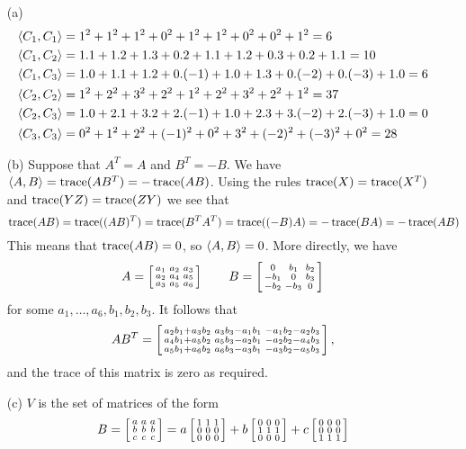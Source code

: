  \begin{itemize}
  \item[(a)]
   \begin{align*}
    \langle C_1,C_1\rangle &= 1^2+1^2+1^2+0^2+1^2+1^2+0^2+0^2+1^2 = 6 \\
    \langle C_1,C_2\rangle &= 1.1+1.2+1.3+0.2+1.1+1.2+0.3+0.2+1.1 = 10 \\
    \langle C_1,C_3\rangle &= 1.0+1.1+1.2+0.(-1)+1.0+1.3+0.(-2)+0.(-3)+1.0 = 6 \\
    \langle C_2,C_2\rangle &= 1^2+2^2+3^2+2^2+1^2+2^2+3^2+2^2+1^2 = 37 \\
    \langle C_2,C_3\rangle &= 1.0+2.1+3.2+2.(-1)+1.0+2.3+3.(-2)+2.(-3)+1.0 = 0 \\
    \langle C_3,C_3\rangle &= 0^2+1^2+2^2+(-1)^2+0^2+3^2+(-2)^2+(-3)^2+0^2 = 28
   \end{align*}
  \item[(b)] Suppose that $A^T=A$ and $B^T=-B$.  We have
   $\langle A,B\rangle=\operatorname{trace}(AB^T)=-\operatorname{trace}(AB)$.  Using the rules
   $\operatorname{trace}(X)=\operatorname{trace}(X^T)$ and $\operatorname{trace}(YZ)=\operatorname{trace}(ZY)$ we see that
   \[ \operatorname{trace}(AB)=\operatorname{trace}((AB)^T)=\operatorname{trace}(B^TA^T)=
      \operatorname{trace}((-B)A)=-\operatorname{trace}(BA)=-\operatorname{trace}(AB)
   \]
   This means that $\operatorname{trace}(AB)=0$, so $\langle A,B\rangle=0$.  More
   directly, we have
   {\tiny \[
     A=\left[\begin{smallmatrix} a_1&a_2&a_3\\ a_2&a_4&a_5\\ a_3&a_5&a_6\end{smallmatrix}\right]
     \hspace{2em}
     B=\left[\begin{smallmatrix} 0&b_1&b_2 \\ -b_1&0&b_3 \\ -b_2&-b_3&0\end{smallmatrix}\right]
    \]}
   for some $a_1,\dotsc,a_6,b_1,b_2,b_3$.  It follows that
   {\tiny \[ AB^T=\left[\begin{smallmatrix}
     a_2b_1+a_3b_2 & a_3b_3-a_1b_1 & -a_1b_2-a_2b_3 \\
     a_4b_1+a_5b_2 & a_5b_3-a_2b_1 & -a_2b_2-a_4b_3 \\
     a_5b_1+a_6b_2 & a_6b_3-a_3b_1 & -a_3b_2-a_5b_3
   \end{smallmatrix}\right], \]}
   and the trace of this matrix is zero as required.
  \item[(c)] $V$ is the set of matrices of the form
   {\tiny \[
     B = \left[\begin{smallmatrix} a & a & a \\ b & b & b \\ c & c & c \end{smallmatrix}\right]
       = a \left[\begin{smallmatrix} 1&1&1\\0&0&0\\0&0&0\end{smallmatrix}\right] +
         b \left[\begin{smallmatrix} 0&0&0\\1&1&1\\0&0&0\end{smallmatrix}\right] +
         c \left[\begin{smallmatrix} 0&0&0\\0&0&0\\1&1&1\end{smallmatrix}\right]
   \]}

\end{itemize}
